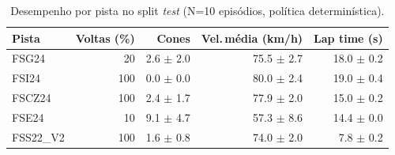 \begin{table}[H]
\centering
\caption{Desempenho por pista no split \textit{test} (N=10 episódios, política determinística).}
\label{tab:per_track_test}
\begin{tabular}{lrrrr}
\toprule
\textbf{Pista} & \textbf{Voltas (\%)} & \textbf{Cones} & \textbf{Vel.\,m\'edia (km/h)} & \textbf{Lap time (s)} \\
\midrule
FSG24 & 20 & 2.6 $\pm$ 2.0 & 75.5 $\pm$ 2.7 & 18.0 $\pm$ 0.2 \\
FSI24 & 100 & 0.0 $\pm$ 0.0 & 80.0 $\pm$ 2.4 & 19.0 $\pm$ 0.4 \\
FSCZ24 & 100 & 2.4 $\pm$ 1.7 & 77.9 $\pm$ 2.0 & 15.0 $\pm$ 0.2 \\
FSE24 & 10 & 9.1 $\pm$ 4.7 & 57.3 $\pm$ 8.6 & 14.4 $\pm$ 0.0 \\
FSS22_V2 & 100 & 1.6 $\pm$ 0.8 & 74.0 $\pm$ 2.0 & 7.8 $\pm$ 0.2 \\
\bottomrule
\end{tabular}
\end{table}
